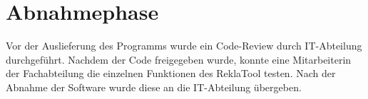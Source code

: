 \section{Abnahmephase} 
\label{sec:Abnahmephase}
Vor der Auslieferung des Programms wurde ein Code-Review durch IT-Abteilung durchgeführt.
Nachdem der Code freigegeben wurde, konnte eine Mitarbeiterin der Fachabteilung die einzelnen
Funktionen des ReklaTool testen. Nach der Abnahme der Software wurde diese an die IT-Abteilung übergeben.